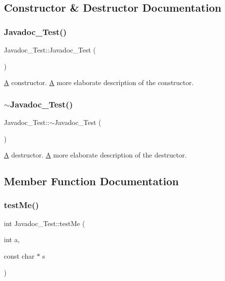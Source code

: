 \subsection{Constructor \& Destructor Documentation}
\mbox{\label{class_javadoc___test_a17313327932ae97596b0a455ba8342cc}} 
\subsubsection{\texorpdfstring{Javadoc\_Test()}{Javadoc\_Test()}}
{\footnotesize\ttfamily Javadoc\+\_\+\+Test\+::\+Javadoc\+\_\+\+Test (\begin{DoxyParamCaption}{ }\end{DoxyParamCaption})}

\mbox{\hyperlink{class_a}{A}} constructor. \mbox{\hyperlink{class_a}{A}} more elaborate description of the constructor. \mbox{\label{class_javadoc___test_a60016cd15a4ed82bbc35be79a0a6a6b5}} 
\subsubsection{\texorpdfstring{$\sim$Javadoc\_Test()}{~Javadoc\_Test()}}
{\footnotesize\ttfamily Javadoc\+\_\+\+Test\+::$\sim$\+Javadoc\+\_\+\+Test (\begin{DoxyParamCaption}{ }\end{DoxyParamCaption})}

\mbox{\hyperlink{class_a}{A}} destructor. \mbox{\hyperlink{class_a}{A}} more elaborate description of the destructor. 

\subsection{Member Function Documentation}
\mbox{\label{class_javadoc___test_a0c472683ed25ff096e8a9edfb18d550c}} 
\subsubsection{\texorpdfstring{testMe()}{testMe()}}
{\footnotesize\ttfamily int Javadoc\+\_\+\+Test\+::test\+Me (\begin{DoxyParamCaption}\item[{int}]{a,  }\item[{const char $\ast$}]{s }\end{DoxyParamCaption})}

